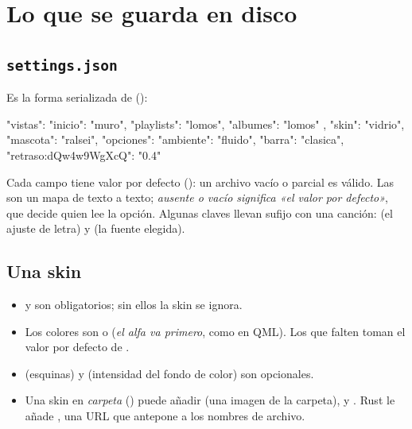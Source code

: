 \section{Lo que se guarda en disco}

\subsection{\texttt{settings.json}}

Es la forma serializada de  ():

\begin{codigo}
{
  "vistas":   { "inicio": "muro", "playlists": "lomos", "albumes": "lomos" },
  "skin":     "vidrio",
  "mascota":  "ralsei",
  "opciones": { "ambiente": "fluido", "barra": "clasica", "retraso:dQw4w9WgXcQ": "0.4" }
}
\end{codigo}

Cada campo tiene valor por defecto (): un archivo vacío o parcial es
válido. Las  son un mapa de texto a texto; \emph{ausente o vacío significa «el
valor por defecto»}, que decide quien lee la opción. Algunas claves llevan sufijo con una
canción:  (el ajuste de letra) y  (la fuente elegida).

\subsection{Una skin}


\begin{itemize}
  \item {} y  son obligatorios; sin ellos la skin se ignora.
  \item Los colores son  o  (\emph{el alfa va primero}, como en
  QML). Los que falten toman el valor por defecto de .
  \item {} (esquinas) y  (intensidad del fondo de color) son opcionales.
  \item Una skin en \emph{carpeta} () puede añadir  (una
  imagen de la carpeta),  y . Rust le añade ,
  una URL  que  antepone a los nombres de archivo.
\end{itemize}

